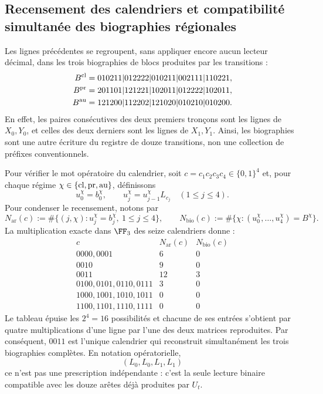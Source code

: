 \begingroup\fontsize{10}{11.8}\selectfont\setlength{\abovedisplayskip}{5pt}\setlength{\belowdisplayskip}{5pt}
\subsection{Recensement des calendriers et compatibilité simultanée des biographies régionales}
Les lignes précédentes se regroupent, sans appliquer encore aucun lecteur décimal,
dans les trois biographies de blocs produites par les transitions :
\begin{align}
 B^{\rm cl}
  &=010211|012222|010211|002111|110221,\notag\\
 B^{\rm pr}
  &=201101|121221|102011|012222|102011,
 \label{act21:eq:biografias-tpk-tres-caracteres}\\
 B^{\rm au}
  &=121200|112202|121020|010210|010200.\notag
\end{align}
En effet, les paires consécutives des deux premiers tronçons sont les lignes de \(X_0,Y_0\), et celles des deux derniers sont les lignes de \(X_1,Y_1\). Ainsi, les biographies sont une autre écriture du registre de douze transitions, non une collection de préfixes conventionnels.

Pour vérifier le mot opératoire du calendrier, soit
\(c=c_1c_2c_3c_4\in\{0,1\}^4\) et, pour chaque régime
\(\chi\in\{{\rm cl},{\rm pr},{\rm au}\}\), définissons
\[
 u_0^\chi=b_0^\chi,\qquad
 u_j^\chi=u_{j-1}^\chi L_{c_j}\quad(1\le j\le4).
\]
Pour condenser le recensement, notons par
\[
 N_{\mathrm{ar}}(c):=
 \#\{(j,\chi):u_j^\chi=b_j^\chi,\ 1\le j\le4\},\qquad
 N_{\mathrm{bio}}(c):=
 \#\{\chi:(u_0^\chi,\ldots,u_4^\chi)=B^\chi\}.
\]
La multiplication exacte dans \(\FF_3\) des seize calendriers donne :
\[
\begin{array}{c|c|c}
 c&N_{\mathrm{ar}}(c)&N_{\mathrm{bio}}(c)\\ \hline
0000,0001&6&0\\
0010&9&0\\
0011&12&3\\
0100,0101,0110,0111&3&0\\
1000,1001,1010,1011&0&0\\
1100,1101,1110,1111&0&0
\end{array}
\tag{D}
\label{act21:eq:censo-dieciseis-calendarios}
\]
Le tableau épuise les \(2^4=16\) possibilités et chacune de ses entrées s'obtient
par quatre multiplications d'une ligne par l'une des deux matrices reproduites.
Par conséquent, \(0011\) est l'unique calendrier qui reconstruit
simultanément les trois biographies complètes. En notation opératorielle,
\begin{equation}
 (L_0,L_0,L_1,L_1)
 \label{act21:eq:calendario-0011-interno}
\end{equation}
ce n'est pas une prescription indépendante : c'est la seule lecture binaire compatible
avec les douze arêtes déjà produites par \(U_t\).


